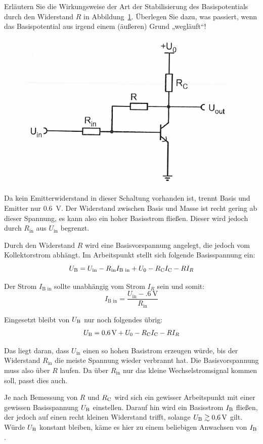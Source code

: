 \begin{problem}
	Erläutern Sie die Wirkungsweise der Art der Stabilisierung des
	Basispotentials durch den Widerstand $R$ in Abbildung~\ref{fig:3_4-16}.
	Überlegen Sie dazu, was passiert, wenn das Basispotential aus irgend einem
	(äußeren) Grund „wegläuft“!
\end{problem}

\begin{figure}[htbp]
	\centering
	\includegraphics[width=.6\textwidth]{Anleitung/3_4-16.png}
	\caption{%
		\cite[Abbildung~3/4.16]{physik313-Anleitung}
	}
	\label{fig:3_4-16}
\end{figure}

Da kein Emitterwiderstand in dieser Schaltung vorhanden ist, trennt Basis und
Emitter nur \SI{.6}{\volt}. Der Widerstand zwischen Basis und Masse ist recht
gering ab dieser Spannung, es kann also ein hoher Basisstrom fließen. Dieser
wird jedoch durch $R_\text{in}$ aus $U_\text{in}$ begrenzt.

Durch den Widerstand $R$ wird eine Basisvorspannung angelegt, die jedoch vom
Kollektorstrom abhängt. Im Arbeitspunkt stellt sich folgende Basisspannung ein:
\[
	U_\text{B} = U_\text{in} - R_\text{in} I_\text{B in}
	+ U_0 - R_\text{C} I_\text{C} - R I_R
\]

Der Strom $I_\text{B in}$ sollte unabhängig vom Strom $I_R$ sein und somit:
\[
	I_\text{B in} = \frac{U_\text{in} - \SI{.6}\volt}{R_\text{in}}
\]

Eingesetzt bleibt von $U_\text{B}$ nur noch folgendes übrig:
\[
	U_\text{B} = \SI{.6}\volt + U_0 - R_\text{C} I_\text{C} - R I_R
\]

Das liegt daran, dass $U_\text{in}$ einen so hohen Basistrom erzeugen würde,
bis der Widerstand $R_\text{in}$ die meiste Spannung wieder verbrannt hat. Die
Basisvorspannung muss also über $R$ laufen. Da über $R_\text{in}$ nur das
kleine Wechselstromsignal kommen soll, passt dies auch.

Je nach Bemessung von $R$ und $R_\text{C}$ wird sich ein gewisser Arbeitspunkt mit
einer gewissen Basisspannung $U_\text{B}$ einstellen. Darauf hin wird ein Basisstrom
$I_\text{B}$ fließen, der jedoch auf einen recht kleinen Widerstand trifft, solange
$U_\text{B} \gtrsim \SI{.6}\volt$ gilt. Würde $U_\text{B}$ konstant bleiben, käme es hier zu
einem beliebigen Anwachsen von $I_\text{B}$.

